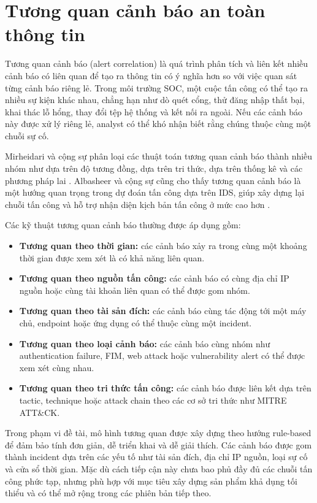 \documentclass[a4paper,12pt,oneside]{book}
\begin{document}
\section{Tương quan cảnh báo an toàn thông tin}
{\fontsize{13pt}{15.6pt}\selectfont

Tương quan cảnh báo (alert correlation) là quá trình phân tích và liên kết nhiều cảnh báo có liên quan để tạo ra thông tin có ý nghĩa hơn so với việc quan sát từng cảnh báo riêng lẻ. Trong môi trường SOC, một cuộc tấn công có thể tạo ra nhiều sự kiện khác nhau, chẳng hạn như dò quét cổng, thử đăng nhập thất bại, khai thác lỗ hổng, thay đổi tệp hệ thống và kết nối ra ngoài. Nếu các cảnh báo này được xử lý riêng lẻ, analyst có thể khó nhận biết rằng chúng thuộc cùng một chuỗi sự cố.

\noindent Mirheidari và cộng sự phân loại các thuật toán tương quan cảnh báo thành nhiều nhóm như dựa trên độ tương đồng, dựa trên tri thức, dựa trên thống kê và các phương pháp lai \cite{mirheidari2018alert}. Albasheer và cộng sự cũng cho thấy tương quan cảnh báo là một hướng quan trọng trong dự đoán tấn công dựa trên IDS, giúp xây dựng lại chuỗi tấn công và hỗ trợ nhận diện kịch bản tấn công ở mức cao hơn \cite{albasheer2022cyber}.

\noindent Các kỹ thuật tương quan cảnh báo thường được áp dụng gồm:

\begin{itemize}
    \item \textbf{Tương quan theo thời gian:} các cảnh báo xảy ra trong cùng một khoảng thời gian được xem xét là có khả năng liên quan.
    \item \textbf{Tương quan theo nguồn tấn công:} các cảnh báo có cùng địa chỉ IP nguồn hoặc cùng tài khoản liên quan có thể được gom nhóm.
    \item \textbf{Tương quan theo tài sản đích:} các cảnh báo cùng tác động tới một máy chủ, endpoint hoặc ứng dụng có thể thuộc cùng một incident.
    \item \textbf{Tương quan theo loại cảnh báo:} các cảnh báo cùng nhóm như authentication failure, FIM, web attack hoặc vulnerability alert có thể được xem xét cùng nhau.
    \item \textbf{Tương quan theo tri thức tấn công:} các cảnh báo được liên kết dựa trên tactic, technique hoặc attack chain theo các cơ sở tri thức như MITRE ATT\&CK.
\end{itemize}

\noindent Trong phạm vi đề tài, mô hình tương quan được xây dựng theo hướng rule-based để đảm bảo tính đơn giản, dễ triển khai và dễ giải thích. Các cảnh báo được gom thành incident dựa trên các yếu tố như tài sản đích, địa chỉ IP nguồn, loại sự cố và cửa sổ thời gian. Mặc dù cách tiếp cận này chưa bao phủ đầy đủ các chuỗi tấn công phức tạp, nhưng phù hợp với mục tiêu xây dựng sản phẩm khả dụng tối thiểu và có thể mở rộng trong các phiên bản tiếp theo.

}
\end{document}
